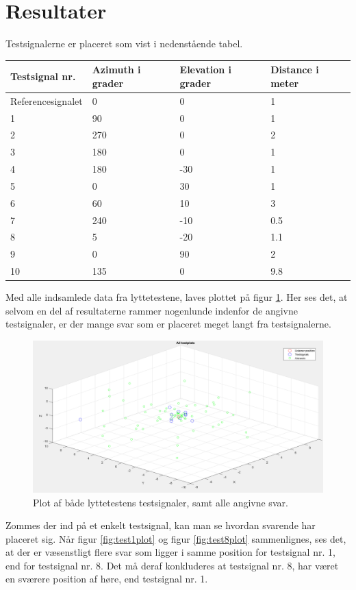 \section{Resultater}

Testsignalerne er placeret som vist i nedenstående tabel.

\begin{tabular}{p{3.2cm}|p{2.3cm}|p{2.3cm}|p{2.3cm}}
	Testsignal nr. & Azimuth i grader & Elevation i grader & Distance i meter \\\hline
	Referencesignalet & 0 & 0 & 1 \\
	1 &90&0&1 \\
	2 &270&0&2 \\
	3 &180&0&1 \\
	4 &180&-30&1 \\
	5 &0&30&1 \\
	6 &60&10&3 \\
	7 &240&-10&0.5 \\
	8 &5&-20&1.1 \\
	9 &0&90&2 \\
	10 &135&0&9.8 \\
\end{tabular}

Med alle indsamlede data fra lyttetestene, laves plottet på figur \ref{fig:allplots}. Her ses det, at selvom en del af resultaterne rammer nogenlunde indenfor de angivne testsignaler, er der mange svar som er placeret meget langt fra testsignalerne. 



\begin{figure}
	\centering
	\includegraphics[width=1\linewidth]{All_Pics/allplots}
	\caption{Plot af både lyttetestens testsignaler, samt alle angivne svar.}
	\label{fig:allplots}
\end{figure}

Zommes der ind på et enkelt testsignal, kan man se hvordan svarende har placeret sig. Når figur \ref{fig:test1plot} og figur \ref{fig:test8plot} sammenlignes, ses det, at der er væsenstligt flere svar som ligger i samme position for testsignal nr. 1, end for testsignal nr. 8. Det må deraf konkluderes at testsignal nr. 8, har været en sværere position af høre, end testsignal nr. 1.

